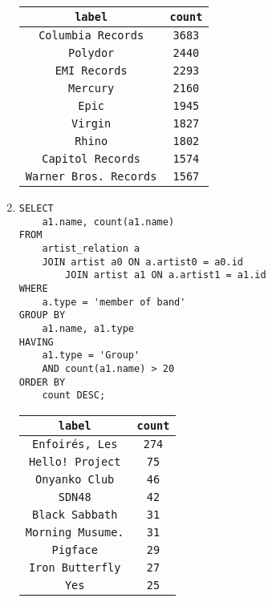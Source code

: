 \documentclass{article}
\begin{document}
\begin{enumerate}
            \begin{tabular}{|c|c|}
                \texttt{label} & \texttt{count} \\
                \toprule
                \texttt{Columbia Records} &  \texttt{3683} \\
                \texttt{Polydor} &   \texttt{2440} \\
                \texttt{EMI Records} &   \texttt{2293} \\
                \texttt{Mercury} &   \texttt{2160} \\
                \texttt{Epic} &  \texttt{1945} \\
                \texttt{Virgin} &    \texttt{1827} \\
                \texttt{Rhino} & \texttt{1802} \\
                \texttt{Capitol Records} &   \texttt{1574} \\
                \texttt{Warner Bros. Records} &  \texttt{1567} \\
            \end{tabular}
        \item
            \begin{verbatim}
SELECT
    a1.name, count(a1.name)
FROM
    artist_relation a
    JOIN artist a0 ON a.artist0 = a0.id
        JOIN artist a1 ON a.artist1 = a1.id
WHERE
    a.type = 'member of band'
GROUP BY
    a1.name, a1.type
HAVING
    a1.type = 'Group'
    AND count(a1.name) > 20
ORDER BY
    count DESC;
            \end{verbatim}
            \begin{tabular}{|c|c|}
                \texttt{label} & \texttt{count} \\
                \toprule
                \texttt{Enfoirés, Les} & \texttt{274} \\
                \texttt{Hello! Project} &    \texttt{75} \\
                \texttt{Onyanko Club} &  \texttt{46} \\
                \texttt{SDN48} & \texttt{42} \\
                \texttt{Black Sabbath} & \texttt{31} \\
                \texttt{Morning Musume.} &   \texttt{31} \\
                \texttt{Pigface} &   \texttt{29} \\
                \texttt{Iron Butterfly} &    \texttt{27} \\
                \texttt{Yes} &   \texttt{25} \\

\end{tabular}
\end{enumerate}
\end{document}
